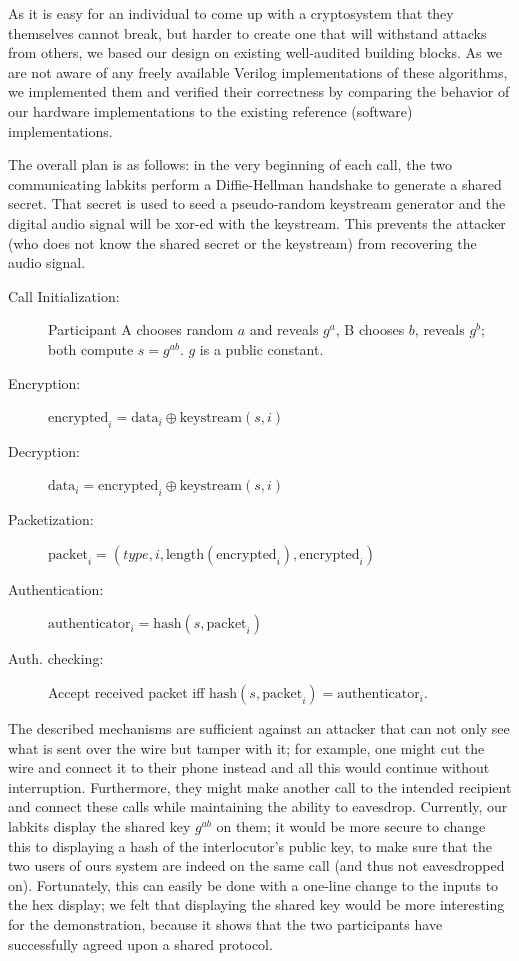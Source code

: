 \documentclass[a4paper]{report}
\begin{document}
As it is easy for an individual to come up with a cryptosystem that they
themselves cannot break, but harder to create one that will %
withstand attacks
from others, we based our design on existing well-audited building
blocks. As we are not aware of any freely available Verilog implementations of
these algorithms, we implemented them and verified their correctness by
comparing the behavior of our hardware implementations to the existing reference
(software) implementations.

The overall plan is as follows: in the very beginning of each call, the two
communicating labkits perform a Diffie-Hellman handshake to generate a
shared secret. That secret is used to seed a pseudo-random keystream
generator and the digital audio signal will be xor-ed with the keystream.
This prevents the attacker (who does not know the shared secret or the
keystream) from recovering the audio signal. 

\begin{description}
  \item[Call Initialization:] Participant A chooses random $a$ and reveals $g^a$,
	  B chooses $b$, reveals $g^b$; both compute $s=g^{ab}$. $g$ is a public constant.
  \item[Encryption:] $\text{encrypted}_i = \text{data}_i \mathbin{\oplus} \text{keystream}(s,i)$
  \item[Decryption:] $\text{data}_i = \text{encrypted}_i \mathbin{\oplus} \text{keystream}(s,i)$
  \item[Packetization:] $\text{packet}_i = \left(type, i, \text{length}(\text{encrypted}_i), \text{encrypted}_i\right)$
  \item[Authentication:] $\text{authenticator}_i = \text{hash}(s, \text{packet}_i)$
  \item[Auth. checking:] Accept received packet iff $\text{hash}(s, \text{packet}_i) = \text{authenticator}_i$.
\end{description}

The described mechanisms are sufficient against an attacker that can not only see
what is sent over the wire but tamper with it; for example, one might cut the
wire and connect it to their phone instead and all this would continue without
interruption. Furthermore, they might make another call to the intended
recipient and connect these calls while maintaining the ability to eavesdrop. Currently, our labkits display the shared key $g^{ab}$ on them; it would be more secure to change this to displaying a hash of the interlocutor's public key, to
make sure that the two users of ours system are indeed on the same call (and
thus not eavesdropped on). Fortunately, this can easily be done with a one-line change to the inputs to the hex display; we felt that displaying the shared key would be more interesting for the demonstration, because it shows that the two participants have successfully agreed upon a shared protocol. 
\end{document}
